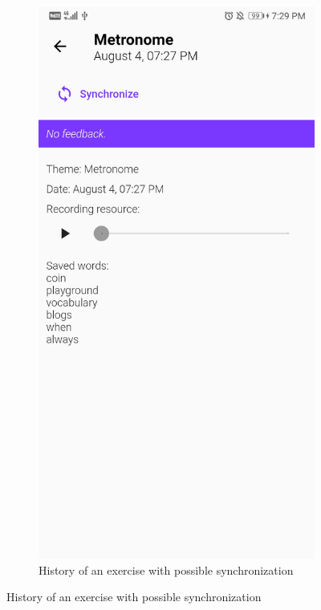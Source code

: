 \begin{appendices}
\begin{landscape}
\begin{figure}[h]
\begin{subfigure}{.25\textwidth}
    \includegraphics[width=.75\linewidth]{content/imgs/screen12.jpg}
    \caption{History of an exercise with possible synchronization}
  \end{subfigure}
\end{figure}



\end{landscape}
\end{appendices}
